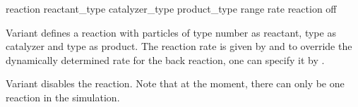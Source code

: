 \begin{essyntax}
 reaction reactant_type  catalyzer_type  
product_type  range  rate  
 reaction off
\begin{features}
\end{features}
\end{essyntax}

Variant  defines a reaction with particles of type number  
as reactant, type  as catalyzer and type  as product. The 
reaction rate is given by  and to override the dynamically determined 
rate for the back reaction, one can specify it by .

Variant  disables the reaction. Note that at the moment, there can 
only be one reaction in the simulation.

